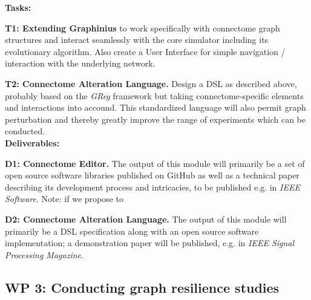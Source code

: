 \documentclass[a4paper,11pt]{article}
\begin{document}


\textbf{Tasks:}

\textbf{T1: Extending Graphinius} to work specifically with connectome graph structures and interact seamlessly with the core simulator including its evolutionary algorithm. Also create a User Interface for simple navigation / interaction with the underlying network.

\textbf{T2: Connectome Alteration Language.} Design a DSL as described above, probably based on the \emph{GReg} framework but taking connectome-specific elements and interactions into accound. This standardized language will also permit graph perturbation and thereby greatly improve the range of experiments which can be conducted.
\\[0,2cm]


\textbf{Deliverables:}

\textbf{D1: Connectome Editor.} The output of this module will primarily be a set of open source software libraries published on GitHub as well as a technical paper describing its development process and intricacies, to be published e.g. in \textit{IEEE Software}.
Note: if we propose to 

\textbf{D2: Connectome Alteration Language.} The output of this module will primarily be a DSL specification along with an open source software implementation; a demonstration paper will be published, e.g. in \textit{IEEE Signal Processing Magazine}.



\subsection{WP 3: Conducting graph resilience studies}
\end{document}

